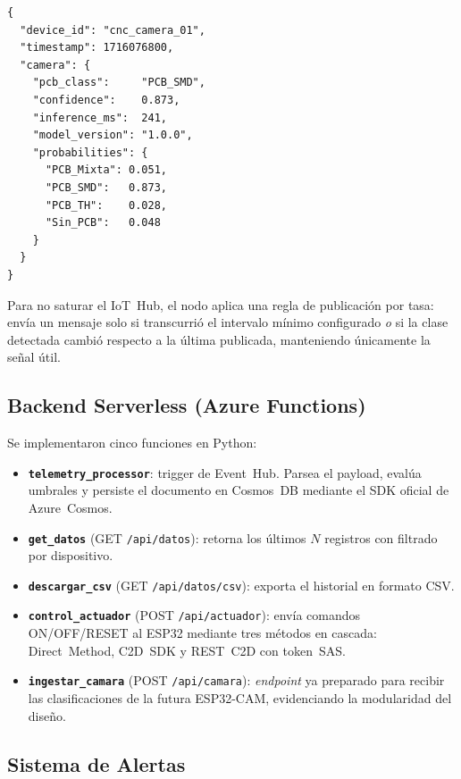\documentclass[journal,transmag]{IEEEtran}
\begin{document}
\begin{lstlisting}[caption={Contrato JSON del nodo de visi\'on (ESP32-CAM).},label={lst:json_cam}]
{
  "device_id": "cnc_camera_01",
  "timestamp": 1716076800,
  "camera": {
    "pcb_class":     "PCB_SMD",
    "confidence":    0.873,
    "inference_ms":  241,
    "model_version": "1.0.0",
    "probabilities": {
      "PCB_Mixta": 0.051,
      "PCB_SMD":   0.873,
      "PCB_TH":    0.028,
      "Sin_PCB":   0.048
    }
  }
}
\end{lstlisting}

Para no saturar el IoT~Hub, el nodo aplica una regla de publicaci\'on por tasa: env\'ia un mensaje solo si transcurri\'o el intervalo m\'inimo configurado \emph{o} si la clase detectada cambi\'o respecto a la \'ultima publicada, manteniendo \'unicamente la se\~nal \'util.

\subsection{Backend Serverless (Azure Functions)}

Se implementaron cinco funciones en Python:

\begin{itemize}
  \item \textbf{\texttt{telemetry\_processor}}: trigger de Event~Hub.
        Parsea el payload, eval\'ua umbrales y persiste el documento en
        Cosmos~DB mediante el SDK oficial de Azure~Cosmos.
  \item \textbf{\texttt{get\_datos}} (GET \texttt{/api/datos}): retorna los
        \'ultimos $N$ registros con filtrado por dispositivo.
  \item \textbf{\texttt{descargar\_csv}} (GET \texttt{/api/datos/csv}):
        exporta el historial en formato CSV.
  \item \textbf{\texttt{control\_actuador}} (POST \texttt{/api/actuador}):
        env\'ia comandos ON/OFF/RESET al ESP32 mediante tres m\'etodos en
        cascada: Direct~Method, C2D~SDK y REST~C2D con token~SAS.
  \item \textbf{\texttt{ingestar\_camara}} (POST \texttt{/api/camara}):
        \textit{endpoint} ya preparado para recibir las clasificaciones de la
        futura ESP32-CAM, evidenciando la modularidad del dise\~no.
\end{itemize}

\subsection{Sistema de Alertas}
\end{document}
